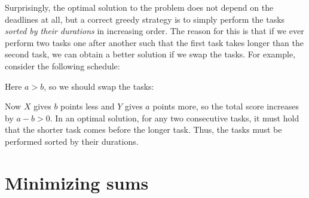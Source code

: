 Surprisingly, the optimal solution to the problem
does not depend on the deadlines at all,
but a correct greedy strategy is to simply
perform the tasks \emph{sorted by their durations}
in increasing order.
The reason for this is that if we ever perform
two tasks one after another such that the first task
takes longer than the second task,
we can obtain a better solution if we swap the tasks.
For example, consider the following schedule:
\begin{center}
\end{center}
Here $a>b$, so we should swap the tasks:
\begin{center}
\end{center}
Now $X$ gives $b$ points less and $Y$ gives $a$ points more,
so the total score increases by $a-b > 0$.
In an optimal solution,
for any two consecutive tasks,
it must hold that the shorter task comes
before the longer task.
Thus, the tasks must be performed
sorted by their durations.

\section{Minimizing sums}

